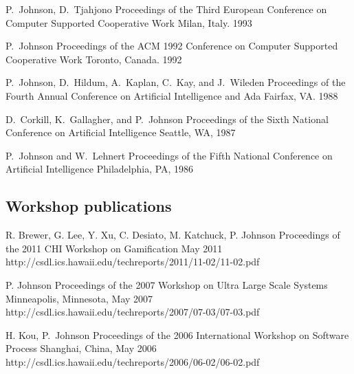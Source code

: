 \documentclass[11pt,letterpaper,sans]{moderncv} %
\begin{document}
          {P.~Johnson, D.~Tjahjono}
          {Proceedings of the Third European Conference on Computer Supported Cooperative Work}
          {Milan, Italy. 1993}

          {P.~Johnson}
          {Proceedings of the ACM 1992 Conference on Computer Supported Cooperative Work}
          {Toronto, Canada. 1992}

          {P.~Johnson, D.~Hildum, A.~Kaplan, C.~Kay, and J.~Wileden}
          {Proceedings of the Fourth Annual Conference on Artificial Intelligence and Ada}
          {Fairfax, VA. 1988}

          {D.~Corkill, K.~Gallagher, and P.~Johnson}
          {Proceedings of the Sixth National Conference on Artificial Intelligence}
          {Seattle, WA, 1987}

          {P.~Johnson and W.~Lehnert}
          {Proceedings of the Fifth National Conference on Artificial Intelligence}
          {Philadelphia, PA, 1986}

\subsection{Workshop publications}

          {R. Brewer, G. Lee, Y. Xu, C. Desiato, M. Katchuck, P. Johnson}
          {Proceedings of the 2011 CHI Workshop on Gamification}
          {May 2011}
          {http://csdl.ics.hawaii.edu/techreports/2011/11-02/11-02.pdf}

          {P. Johnson}
          {Proceedings of the 2007 Workshop on Ultra Large Scale Systems}
          {Minneapolis, Minnesota, May 2007}
          {http://csdl.ics.hawaii.edu/techreports/2007/07-03/07-03.pdf}

          {H. Kou, P.~Johnson}
          {Proceedings of the 2006 International Workshop on Software Process}
          {Shanghai, China, May 2006}
          {http://csdl.ics.hawaii.edu/techreports/2006/06-02/06-02.pdf}
\end{document}
